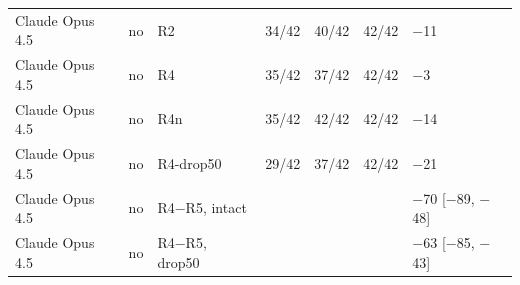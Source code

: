 \begin{table}[t]
\begin{tabular}{lllrrrl}
\addlinespace
Claude Opus 4.5 & no & R2 & 34/42 & 40/42 & 42/42 & $-$11 \\
Claude Opus 4.5 & no & R4 & 35/42 & 37/42 & 42/42 & $-$3 \\
Claude Opus 4.5 & no & R4n & 35/42 & 42/42 & 42/42 & $-$14 \\
Claude Opus 4.5 & no & R4-drop50 & 29/42 & 37/42 & 42/42 & $-$21 \\
Claude Opus 4.5 & no & R4$-$R5, intact & \multicolumn{3}{c}{} & $-$70 [$-$89, $-$48] \\
Claude Opus 4.5 & no & R4$-$R5, drop50 & \multicolumn{3}{c}{} & $-$63 [$-$85, $-$43] \\
\bottomrule
\end{tabular}
\end{table}
